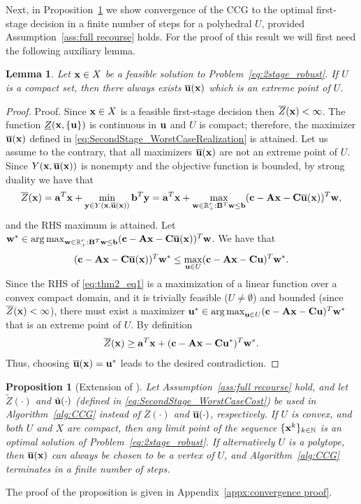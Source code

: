 \documentclass[12pt,x11names]{article}
\newtheorem{proposition}{Proposition} %
\newtheorem{lemma}{Lemma} %
\theoremstyle{definition}
\newcommand{\real}{\mathbb{R}} %
\newcommand{\ba}{{\bf a}}
\newcommand{\bb}{{\bf b}}
\newcommand{\bc}{{\bf c}}
\newcommand{\bu}{{\bf u}}
\newcommand{\bw}{{\bf w}}
\newcommand{\bx}{{\bf x}}
\newcommand{\by}{{\bf y}}
\newcommand{\bba}{{\bf A}}
\newcommand{\bbb}{{\bf B}}
\newcommand{\bbc}{{\bf C}}
\DeclareMathOperator*{\argmax}{arg\,max}
\begin{document}
Next, in Proposition~\ref{prop:CCG_converge} we show convergence of the CCG to the optimal first-stage decision in a finite number of steps for a polyhedral $U$, provided Assumption~\ref{ass:full recourse} holds. For the proof of this result we will first need the following auxiliary lemma.
\begin{lemma}\label{lemma:Maximizer_ExtremePoint}
Let $\bx\in X$ be a feasible solution to Problem~\eqref{eq:2stage_robust}. If $U$ is a compact set, then there always exists $\overline{\bu}(\bx)$ which is an extreme point of $U$.
\end{lemma}
\begin{proof}{Proof.}
Since $\bx\in X$ is a feasible first-stage decision then $\overline{Z}(\bx)<\infty$. The function $\underline{Z}(\bx,\{\bu\})$ is continuous in $\bu$ and $U$ is compact; therefore, the maximizer $\overline{\bu}(\bx)$ defined in \eqref{eq:SecondStage_WorstCaseRealization} is attained.
Let us assume to the contrary, that all maximizers $\overline{\bu}(\bx)$ are not an extreme point of $U$. Since $Y(\bx,\overline{\bu}(\bx) )$ is nonempty and the objective function is bounded, by strong duality we have that
$$\overline{Z}(\bx)=\ba^T\bx+\min_{\by\in Y(\bx,\overline{\bu}(\bx))} \bb^T\by=\ba^T\bx+\max_{\bw\in\real^r_+:\bbb^T\bw\leq \bb} (\bc-\bba\bx-\bbc\overline{\bu}(\bx))^T\bw,$$
and the RHS maximum is attained.
Let $\bw^*\in \argmax_{\bw\in\real^r_+:\bbb^T\bw\leq \bb} (\bc-\bba\bx-\bbc\overline{\bu}(\bx))^T\bw$. We have that
\begin{equation}\label{eq:thm2_eq1} (\bc-\bba\bx-\bbc\overline{\bu}(\bx))^T\bw^*\leq\max_{\bu\in U} (\bc-\bba\bx-\bbc\bu)^T\bw^*.\end{equation}
Since the RHS of \eqref{eq:thm2_eq1} is a maximization of a linear function over a convex compact domain, and it is trivially feasible ($U\neq\emptyset$) and bounded (since $\overline{Z}(\bx)<\infty$), there must exist a maximizer $\bu^*\in  \argmax_{\bu\in U}(\bc-\bba\bx-\bbc\bu)^T\bw^*$ that is an extreme point of $U$. By definition 
$$\overline{Z}(\bx)\geq \ba^T\bx+(\bc-\bba\bx-\bbc\bu^*)^T\bw^*.$$ Thus, choosing $\overline{\bu}(\bx)=\bu^*$ leads to the desired contradiction.%
\end{proof}
\begin{proposition}[Extension of {\citep[Proposition 2]{Zeng2013}}]\label{prop:CCG_converge}
Let Assumption~\ref{ass:full recourse} hold, and let $\tilde{Z}(\cdot)$ and $\tilde{\bu}(\cdot)$ (defined in \eqref{eq:SecondStage_WorstCaseCost}) be used  in Algorithm~\ref{alg:CCG} instead of $\overline{Z}(\cdot)$ and $\overline{\bu}(\cdot)$, respectively. If $U$ is convex, and both $U$ and $X$ are compact, then any limit point of the sequence $\{\bx^k\}_{k\in\mathbb{N}}$ is an optimal solution of Problem~\eqref{eq:2stage_robust}.  If alternatively $U$ is a polytope, then $\overline{\bu}(\bx)$ can always be chosen to be a vertex of $U$, and Algorithm~\ref{alg:CCG} terminates in a finite number of steps.
\end{proposition}
The proof of the proposition is given in Appendix~\ref{appx:convergence proof}.
\end{document}
